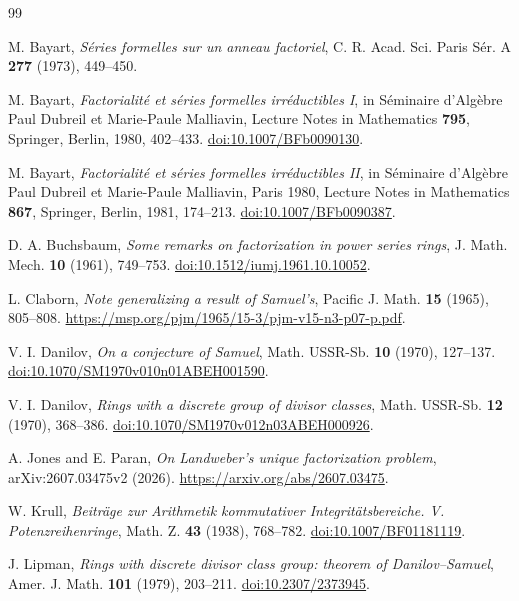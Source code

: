 \documentclass[11pt]{amsart}
\theoremstyle{remark}
\begin{document}
\begin{thebibliography}{99}
\raggedright
{}
M. Bayart, \emph{S\'eries formelles sur un anneau factoriel},
C. R. Acad. Sci. Paris S\'er. A \textbf{277} (1973), 449--450.

M. Bayart, \emph{Factorialit\'e et s\'eries formelles irr\'eductibles I},
in S\'eminaire d'Alg\`ebre Paul Dubreil et Marie-Paule Malliavin,
Lecture Notes in Mathematics \textbf{795},
Springer, Berlin, 1980, 402--433.
\href{https://doi.org/10.1007/BFb0090130}{doi:10.1007/BFb0090130}.

M. Bayart, \emph{Factorialit\'e et s\'eries formelles irr\'eductibles II},
in S\'eminaire d'Alg\`ebre Paul Dubreil et Marie-Paule Malliavin,
Paris 1980, Lecture Notes in Mathematics \textbf{867},
Springer, Berlin, 1981, 174--213.
\href{https://doi.org/10.1007/BFb0090387}{doi:10.1007/BFb0090387}.

D. A. Buchsbaum, \emph{Some remarks on factorization in power series rings},
J. Math. Mech. \textbf{10} (1961), 749--753.
\href{https://doi.org/10.1512/iumj.1961.10.10052}{doi:10.1512/iumj.1961.10.10052}.

L. Claborn, \emph{Note generalizing a result of Samuel's},
Pacific J. Math. \textbf{15} (1965), 805--808.
\url{https://msp.org/pjm/1965/15-3/pjm-v15-n3-p07-p.pdf}.

V. I. Danilov, \emph{On a conjecture of Samuel},
Math. USSR-Sb. \textbf{10} (1970), 127--137.
\href{https://doi.org/10.1070/SM1970v010n01ABEH001590}{doi:10.1070/SM1970v010n01ABEH001590}.

V. I. Danilov, \emph{Rings with a discrete group of divisor classes},
Math. USSR-Sb. \textbf{12} (1970), 368--386.
\href{https://doi.org/10.1070/SM1970v012n03ABEH000926}{doi:10.1070/SM1970v012n03ABEH000926}.

A. Jones and E. Paran, \emph{On Landweber's unique factorization
problem}, arXiv:2607.03475v2 (2026).
\url{https://arxiv.org/abs/2607.03475}.

W. Krull, \emph{Beitr\"age zur Arithmetik kommutativer
Integrit\"atsbereiche. V. Potenzreihenringe},
Math. Z. \textbf{43} (1938), 768--782.
\href{https://doi.org/10.1007/BF01181119}{doi:10.1007/BF01181119}.

J. Lipman, \emph{Rings with discrete divisor class group:
theorem of Danilov--Samuel},
Amer. J. Math. \textbf{101} (1979), 203--211.
\href{https://doi.org/10.2307/2373945}{doi:10.2307/2373945}.


\end{thebibliography}
\end{document}
